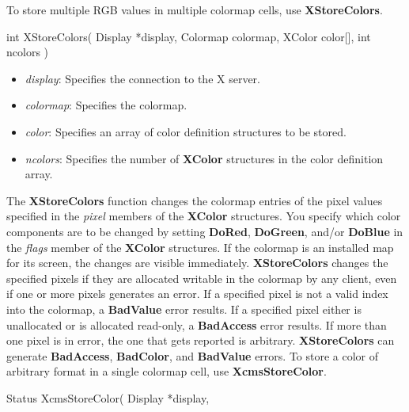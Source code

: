 \documentclass{report}
\begin{document}
\begin{itemize}
            \bigbreak \noindent
            To store multiple RGB values in multiple colormap cells, use \textbf{XStoreColors}.
            \bigbreak \noindent
            \begin{cppcode}
                int XStoreColors(
                    Display *display,
                    Colormap colormap,
                    XColor color[],
                    int ncolors
                )
            \end{cppcode}
            \bigbreak \noindent
            \begin{itemize}
                \item \textit{display}: Specifies the connection to the X server.
                \item \textit{colormap}: Specifies the colormap.
                \item \textit{color}: Specifies an array of color definition structures to be stored.
                \item \textit{ncolors}: Specifies the number of \textbf{XColor} structures in the color definition array.
            \end{itemize}
            \noindent
            The \textbf{XStoreColors} function changes the colormap entries of the pixel values specified in the \textit{pixel} members of the \textbf{XColor} structures. You specify which color components are to be changed by setting \textbf{DoRed}, \textbf{DoGreen}, and/or \textbf{DoBlue} in the \textit{flags} member of the \textbf{XColor} structures. If the colormap is an installed map for its screen, the changes are visible immediately.
            \bigbreak \noindent
            \textbf{XStoreColors} changes the specified pixels if they are allocated writable in the colormap by any client, even if one or more pixels generates an error. If a specified pixel is not a valid index into the colormap, a \textbf{BadValue} error results. If a specified pixel either is unallocated or is allocated read-only, a \textbf{BadAccess} error results. If more than one pixel is in error, the one that gets reported is arbitrary.
            \bigbreak \noindent
            \textbf{XStoreColors} can generate \textbf{BadAccess}, \textbf{BadColor}, and \textbf{BadValue} errors.
            \bigbreak \noindent
            To store a color of arbitrary format in a single colormap cell, use \textbf{XcmsStoreColor}.
            \bigbreak \noindent
            \begin{cppcode}
                Status XcmsStoreColor(
                    Display *display,

\end{cppcode}
\end{itemize}
\end{document}
